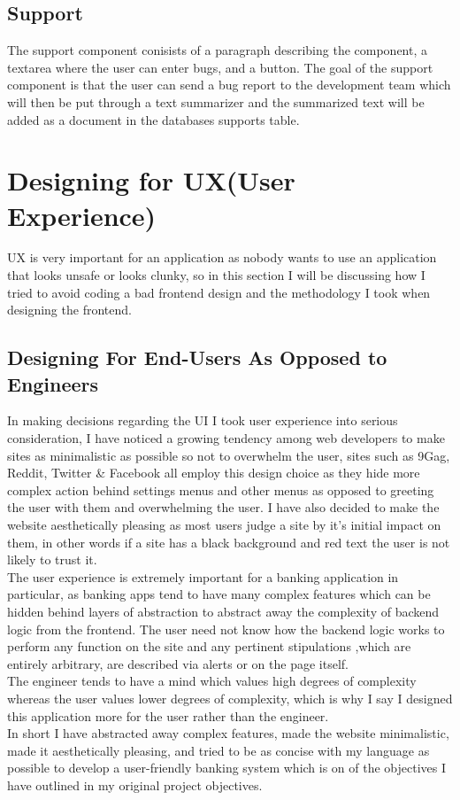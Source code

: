 \subsection{Support}
The support component conisists of a paragraph describing the component, a textarea where the user can enter bugs, and a button.  The goal of the support component is that the user can send a bug report to the development team which will then be put through a text summarizer and the summarized text will be added as a document in the databases supports table.

\section{Designing for UX(User Experience)}
UX is very important for an application as nobody wants to use an application that looks unsafe or looks clunky, so in this section I will be discussing how I tried to avoid coding a bad frontend design and the methodology I took when designing the frontend.
\subsection{Designing For End-Users As Opposed to Engineers}
In making decisions regarding the UI I took user experience into serious consideration,
I have noticed a growing tendency among web developers to make sites as minimalistic as
possible so not to overwhelm the user, sites such as 9Gag, Reddit, Twitter \& Facebook
all employ this design choice as they hide more complex action behind settings menus
and other menus as opposed to greeting the user with them and overwhelming the user.  I have also decided to
make the website aesthetically pleasing as most users judge a site by it's initial
impact on them, in other words if a site has a black background and red text the user
is not likely to trust it.
\\
The user experience is extremely important for a banking application in particular,
as banking apps tend to have many complex features which can be hidden behind layers
of abstraction to abstract away the complexity of backend logic from the frontend.
The user need not know how the backend logic works to perform any function on the
site and any pertinent stipulations ,which are entirely arbitrary, are described via
alerts or on the page itself.
\\
The engineer tends to have a mind which values high degrees of complexity whereas
the user values lower degrees of complexity, which is why I say I designed this
application more for the user rather than the engineer.
\\
In short I have abstracted away complex features, made the website minimalistic,
made it aesthetically pleasing, and tried to be as concise with my language as
possible to develop a user-friendly banking system which is on of the objectives
I have outlined in my original project objectives.
